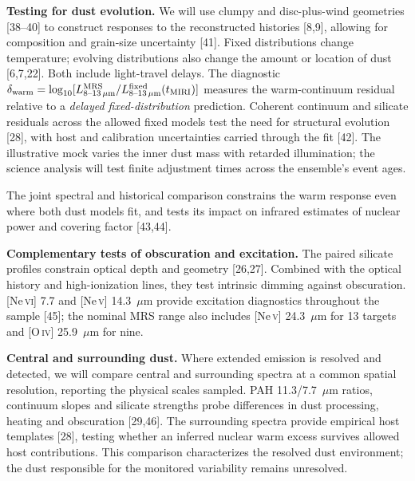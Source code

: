 \documentclass[12pt]{article}
\begin{document}
\noindent\textbf{Testing for dust evolution.}
We will use clumpy and disc-plus-wind geometries [38--40] to construct responses to the reconstructed histories [8,9], allowing for composition and grain-size uncertainty [41]. Fixed distributions change temperature; evolving distributions also change the amount or location of dust [6,7,22]. Both include light-travel delays. The diagnostic $\delta_{\rm warm}=\log_{10}[L^{\rm MRS}_{8\text{--}13\,\mu{\rm m}}/L^{\rm fixed}_{8\text{--}13\,\mu{\rm m}}(t_{\rm MIRI})]$ measures the warm-continuum residual relative to a \emph{delayed fixed-distribution} prediction. Coherent continuum and silicate residuals across the allowed fixed models test the need for structural evolution [28], with host and calibration uncertainties carried through the fit [42]. The illustrative mock varies the inner dust mass with retarded illumination; the science analysis will test finite adjustment times across the ensemble's event ages.

The joint spectral and historical comparison constrains the warm response even where both dust models fit, and tests its impact on infrared estimates of nuclear power and covering factor [43,44].

\noindent\textbf{Complementary tests of obscuration and excitation.}
The paired silicate profiles constrain optical depth and geometry [26,27]. Combined with the optical history and high-ionization lines, they test intrinsic dimming against obscuration. [Ne\,\textsc{vi}] 7.7 and [Ne\,\textsc{v}] 14.3~$\mu$m provide excitation diagnostics throughout the sample [45]; the nominal MRS range also includes [Ne\,\textsc{v}] 24.3~$\mu$m for 13 targets and [O\,\textsc{iv}] 25.9~$\mu$m for nine.

\noindent\textbf{Central and surrounding dust.}
Where extended emission is resolved and detected, we will compare central and surrounding spectra at a common spatial resolution, reporting the physical scales sampled. PAH 11.3/7.7~$\mu$m ratios, continuum slopes and silicate strengths probe differences in dust processing, heating and obscuration [29,46]. The surrounding spectra provide empirical host templates [28], testing whether an inferred nuclear warm excess survives allowed host contributions. This comparison characterizes the resolved dust environment; the dust responsible for the monitored variability remains unresolved.
\end{document}
